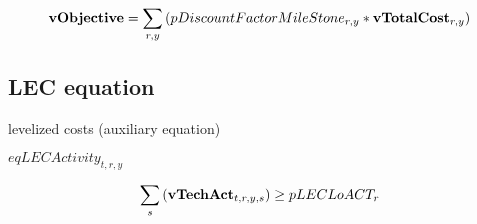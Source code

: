 \documentclass{article}
\begin{document}
\begin{dmath}
{\bf vObjective}  =  \sum_{r,y}{\left(pDiscountFactorMileStone_{r,y}*{\bf vTotalCost}_{r,y}\right)}
\end{dmath}
\subsection*{LEC equation}
levelized costs (auxiliary equation)







$eqLECActivity_{t,r,y}$





\begin{dmath}
\sum_{s}{\left({\bf vTechAct}_{t,r,y,s}\right)}  \ge  pLECLoACT_{r}
\end{dmath}
\end{document}
